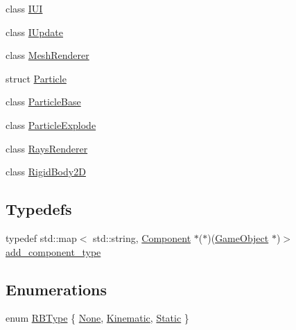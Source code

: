 \begin{DoxyCompactItemize}
class \mbox{\hyperlink{class_beer_engine_1_1_component_1_1_i_u_i}{I\+UI}}
\item 
class \mbox{\hyperlink{class_beer_engine_1_1_component_1_1_i_update}{I\+Update}}
\item 
class \mbox{\hyperlink{class_beer_engine_1_1_component_1_1_mesh_renderer}{Mesh\+Renderer}}
\item 
struct \mbox{\hyperlink{struct_beer_engine_1_1_component_1_1_particle}{Particle}}
\item 
class \mbox{\hyperlink{class_beer_engine_1_1_component_1_1_particle_base}{Particle\+Base}}
\item 
class \mbox{\hyperlink{class_beer_engine_1_1_component_1_1_particle_explode}{Particle\+Explode}}
\item 
class \mbox{\hyperlink{class_beer_engine_1_1_component_1_1_rays_renderer}{Rays\+Renderer}}
\item 
class \mbox{\hyperlink{class_beer_engine_1_1_component_1_1_rigid_body2_d}{Rigid\+Body2D}}
\end{DoxyCompactItemize}
\subsection*{Typedefs}
\begin{DoxyCompactItemize}
\item 
typedef std\+::map$<$ std\+::string, \mbox{\hyperlink{class_beer_engine_1_1_component_1_1_component}{Component}} $\ast$($\ast$)(\mbox{\hyperlink{class_beer_engine_1_1_game_object}{Game\+Object}} $\ast$)$>$ \mbox{\hyperlink{namespace_beer_engine_1_1_component_a58109916ff3e951c90c1dcd5ebba359b}{add\+\_\+component\+\_\+type}}
\end{DoxyCompactItemize}
\subsection*{Enumerations}
\begin{DoxyCompactItemize}
\item 
enum \mbox{\hyperlink{namespace_beer_engine_1_1_component_a2cfe279cc309b6420e792597940b8a33}{R\+B\+Type}} \{ \mbox{\hyperlink{namespace_beer_engine_1_1_component_a2cfe279cc309b6420e792597940b8a33acb34c3e689c3481039b827066b82b0fe}{None}}, 
\mbox{\hyperlink{namespace_beer_engine_1_1_component_a2cfe279cc309b6420e792597940b8a33ad7c835b3b41a70a283c8341e42bfb0d7}{Kinematic}}, 
\mbox{\hyperlink{namespace_beer_engine_1_1_component_a2cfe279cc309b6420e792597940b8a33a203b46f3390c5d8151a1a235c8a6d26f}{Static}}
 \}
\end{DoxyCompactItemize}



